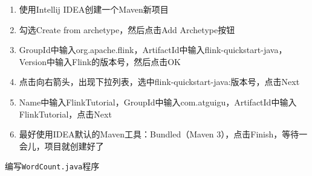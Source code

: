 \documentclass[cn,11pt,chinese]{elegantbook}
\providecommand{\tightlist}{%
  \setlength{\itemsep}{0pt}\setlength{\parskip}{0pt}}
\begin{document}
\begin{enumerate}
\def\labelenumi{\arabic{enumi}.}
\tightlist
\item
  使用Intellij IDEA创建一个Maven新项目
\item
  勾选Create from archetype，然后点击Add Archetype按钮
\item
  GroupId中输入org.apache.flink，ArtifactId中输入flink-quickstart-java，Version中输入Flink的版本号，然后点击OK
\item
  点击向右箭头，出现下拉列表，选中flink-quickstart-java:版本号，点击Next
\item
  Name中输入FlinkTutorial，GroupId中输入com.atguigu，ArtifactId中输入FlinkTutorial，点击Next
\item
  最好使用IDEA默认的Maven工具：Bundled（Maven
  3），点击Finish，等待一会儿，项目就创建好了
\end{enumerate}

编写\texttt{WordCount.java}程序
\end{document}

